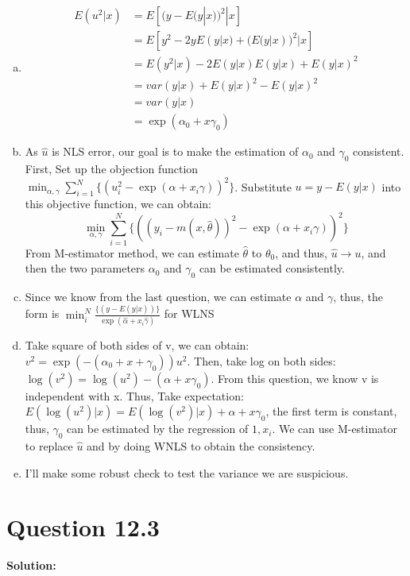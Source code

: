\documentclass[11pt]{article} %
\begin{document}
\begin{enumerate}[a.]
	\item \begin{align*}
		E(u^2|x)&=E[(y-E(y|x))^2|x]\\
				&=E[y^2-2yE(y|x)+(E(y|x))^2|x]\\
				&=E(y^2|x)-2E(y|x)E(y|x)+E(y|x)^2\\
				&=var(y|x)+E(y|x)^2-E(y|x)^2\\
				&=var(y|x)\\
				&=\exp(\alpha_0+x\gamma_0)
	\end{align*}
	\item As $\hat{u}$ is NLS error, our goal is to make the estimation of $\alpha_0$ and $\gamma_0$ consistent. First,
		Set up the objection function $\min_{\alpha,\gamma}\sum_{i=1}^N\{(u_i^2-\exp( \alpha+x_i\gamma))^2\}$. Substitute $u=y-E(y|x)$ into this objective function, we can obtain:
		\begin{equation*}
			\min_{\alpha,\gamma}\sum_{i=1}^N\{((y_i-m(x,\hat{\theta}))^2-\exp(\alpha+x_i\gamma))^2\}
		\end{equation*}
	From M-estimator method, we can estimate $\hat{\theta}$ to $\theta_0$, and thus, $\hat{u}\rightarrow u$, and then the two parameters $\alpha_0$ and $\gamma_0$ can be estimated consistently. 
	\item Since we know from the last question, we can estimate $\alpha$ and $\gamma$, thus, the form is $\min_{i}^N \frac{\{(y-E(y|x))\}}{\exp(\hat{\alpha}+x_i\hat{\gamma})}$ for WLNS
	\item Take square of both sides of v, we can obtain: $v^2=\exp(-(\alpha_0+x+\gamma_0))u^2$. Then, take log on both sides: $\log(v^2)=\log(u^2)-(\alpha+x\gamma_0)$. From this question, we know v is independent with x.
		Thus, Take expectation: $E(\log(u^2)|x)=E(\log(v^2)|x)+\alpha+x\gamma_0$, the first term is constant, thus, $\gamma_0$ can be estimated by the regression of $1, x_i$. We can use M-estimator to replace $\hat{u}$ and by doing WNLS to obtain the consistency. 
	\item I'll make some robust check to test the variance we are suspicious.
\end{enumerate}




\section{Question 12.3}
\textbf{Solution:}
\end{document}
